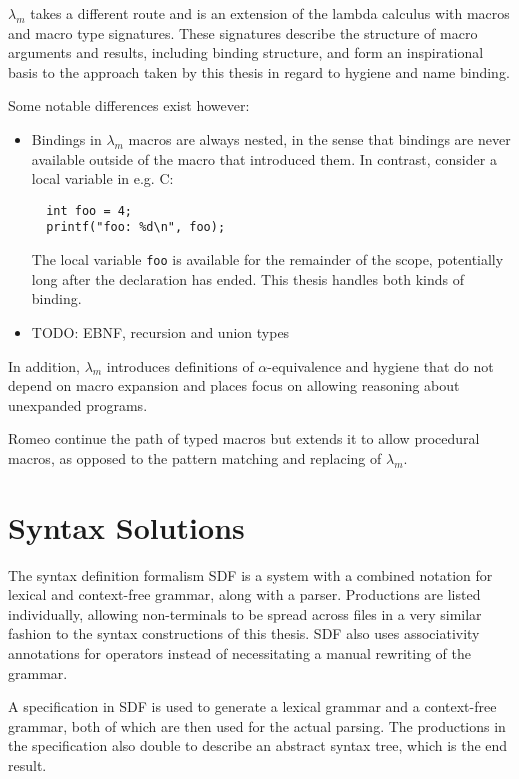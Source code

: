 \documentclass{kththesis}
\begin{document}
$\lambda_m$ \cite{Herman2010} takes a different route and is an extension of the lambda calculus with macros and macro type signatures. These signatures describe the structure of macro arguments and results, including binding structure, and form an inspirational basis to the approach taken by this thesis in regard to hygiene and name binding.

Some notable differences exist however:
\begin{itemize}
  \item Bindings in $\lambda_m$ macros are always nested, in the sense that bindings are never available outside of the macro that introduced them. In contrast, consider a local variable in e.g. C:
  \begin{verbatim}
  int foo = 4;
  printf("foo: %d\n", foo);
  \end{verbatim}
  The local variable \texttt{foo} is available for the remainder of the scope, potentially long after the declaration has ended. This thesis handles both kinds of binding.
  \item TODO: EBNF, recursion and union types
\end{itemize}

In addition, $\lambda_m$ introduces definitions of $\alpha$-equivalence and hygiene that do not depend on macro expansion and places focus on allowing reasoning about unexpanded programs.

Romeo \cite{Stansifer2014} continue the path of typed macros but extends it to allow procedural macros, as opposed to the pattern matching and replacing of $\lambda_m$.

\section{Syntax Solutions} \label{sec:syntax-solutions}

The syntax definition formalism SDF \cite{Heering1989} is a system with a combined notation for lexical and context-free grammar, along with a parser. Productions are listed individually, allowing non-terminals to be spread across files in a very similar fashion to the syntax constructions of this thesis. SDF also uses associativity annotations for operators instead of necessitating a manual rewriting of the grammar.

A specification in SDF is used to generate a lexical grammar and a context-free grammar, both of which are then used for the actual parsing. The productions in the specification also double to describe an abstract syntax tree, which is the end result.
\end{document}
